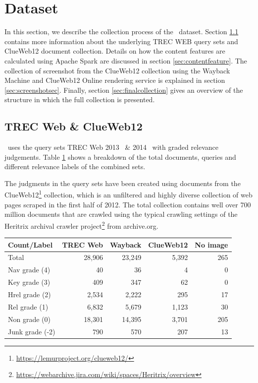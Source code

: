 
\section{Dataset}\label{sec:dataset}
In this section, we describe the collection process of the \datasetname~data\-set. Section \ref{sec:trecclue} contains more information about the underlying TREC WEB query sets and ClueWeb12 document collection. Details on how the content features are calculated using Apache Spark are discussed in section \ref{sec:contentfeature}. The collection of screenshot from the ClueWeb12 collection using the Wayback Machine and ClueWeb12 Online rendering service is explained in section \ref{sec:screenshotsec}. Finally, section \ref{sec:finalcollection} gives an overview of the structure in which the full collection is presented.

\subsection{TREC Web \& ClueWeb12 }\label{sec:trecclue}
\datasetname~uses the query sets TREC Web 2013~\cite{collins2013trec} \& 2014~\cite{collins2015trec} with graded relevance judgements. Table \ref{tab:countsources} shows a breakdown of the total documents, queries and different relevance labels of the combined sets. 

The judgments in the query sets have been created using documents from the  ClueWeb12\footnote{\url{https://lemurproject.org/clueweb12/}} collection, which is an unfiltered and highly diverse collection of web pages scraped in the first half of 2012. The total collection contains well over 700 million documents that are crawled using the typical crawling settings of the Heritrix archival crawler project\footnote{\url{https://webarchive.jira.com/wiki/spaces/Heritrix/overview}} from archive.org.  


\begin{table}[h]
  \label{tab:countsources}
  \begin{tabular}{ l | r | r  r  r }
  \toprule
    Count/Label & TREC Web & Wayback & ClueWeb12 & No image\\
    \midrule
    Total & 28,906 & 23,249 & 5,392 & 265 \\
    Nav grade (4) & 40 & 36 & 4 & 0\\
    Key grade (3) & 409 & 347 & 62 & 0\\
    Hrel grade (2) & 2,534 & 2,222 & 295 & 17 \\
    Rel grade (1) & 6,832 & 5,679 & 1,123 & 30\\
    Non grade (0) & 18,301 & 14,395 & 3,701 & 205 \\
    Junk grade (-2) & 790 & 570 & 207 & 13\\
    \bottomrule
  \end{tabular} 
\end{table}


